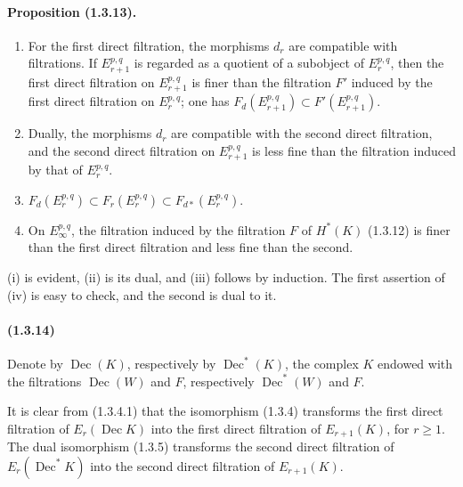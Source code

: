 \documentclass[10pt]{article}
\newcommand{\Dec}{\operatorname{Dec}}
\begin{document}
\paragraph{Proposition (1.3.13).}
\begin{enumerate}[label=(\roman*)]
\item For the first direct filtration, the morphisms $d_r$ are compatible with filtrations. If $E_{r+1}^{p,q}$ is regarded as a quotient of a subobject of $E_r^{p,q}$, then the first direct filtration on $E_{r+1}^{p,q}$ is finer than the filtration $F'$ induced by the first direct filtration on $E_r^{p,q}$; one has $F_d(E_{r+1}^{p,q})\subset F'(E_{r+1}^{p,q})$.
\item Dually, the morphisms $d_r$ are compatible with the second direct filtration, and the second direct filtration on $E_{r+1}^{p,q}$ is less fine than the filtration induced by that of $E_r^{p,q}$.
\item $F_d(E_r^{p,q})\subset F_r(E_r^{p,q})\subset F_{d*}(E_r^{p,q})$.
\item On $E_\infty^{p,q}$, the filtration induced by the filtration $F$ of $H^*(K)$ (1.3.12) is finer than the first direct filtration and less fine than the second.
\end{enumerate}
(i) is evident, (ii) is its dual, and (iii) follows by induction. The first assertion of (iv) is easy to check, and the second is dual to it.

\paragraph{(1.3.14)} Denote by $\Dec(K)$, respectively by $\Dec^*(K)$, the complex $K$ endowed with the filtrations $\Dec(W)$ and $F$, respectively $\Dec^*(W)$ and $F$.

It is clear from (1.3.4.1) that the isomorphism (1.3.4) transforms the first direct filtration of $E_r(\Dec K)$ into the first direct filtration of $E_{r+1}(K)$, for $r\ge1$. The dual isomorphism (1.3.5) transforms the second direct filtration of $E_r(\Dec^*K)$ into the second direct filtration of $E_{r+1}(K)$.
\end{document}
